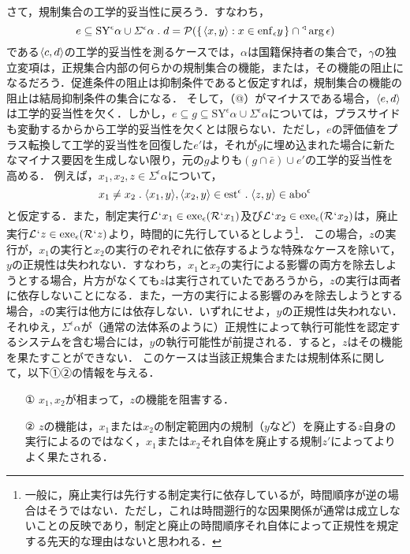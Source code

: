 さて，規制集合の工学的妥当性に戻ろう．すなわち，
\[
    e\subseteq \mathrm{SY}^{\epsilon}\alpha\cup \varSigma^{\epsilon}\alpha\con{1}d = \mathcal{P}(\classab{\orp{x,y}:x\in\enf{\epsilon}y}\cap\trgl{\arg\epsilon})
\]
である$ \langle c,d \rangle $の工学的妥当性を測るケースでは，$\alpha$は国籍保持者の集合で，$\gamma$の独立変項は，正規集合内部の何らかの規制集合の機能，または，その機能の阻止になるだろう．促進条件の阻止は抑制条件であると仮定すれば，規制集合の機能の阻止は結局抑制条件の集合になる．
そして，（@）がマイナスである場合，$ \langle e,d \rangle $は工学的妥当性を欠く．しかし，$ e\subseteq g \subseteq \mathrm{SY}^{\epsilon}\alpha\cup \varSigma^{\epsilon}\alpha $については，プラスサイドも変動するからから工学的妥当性を欠くとは限らない．ただし，$e$の評価値をプラス転換して工学的妥当性を回復した$ e' $は，それが$ g $に埋め込まれた場合に新たなマイナス要因を生成しない限り，元の$g$よりも$ (g\cap\bar{e})\cup e' $の工学的妥当性を高める．
例えば，$ x_1,x_2,z\in\varSigma^{\epsilon}\alpha $について，
\[
    x_1\neq x_2\con{1}\orp{x_1,y},\orp{x_2,y}\in\mathrm{est}^\epsilon\con{1}\orp{z,y}\in \mathrm{abo}^\epsilon
\]
と仮定する．また，制定実行$ \mathcal{L}{\mspace{1mu}{`}\mspace{1mu}} x_1\in\mathrm{exe}_{\epsilon}{(\mathcal{R}{\mspace{1mu}{`}\mspace{1mu}} x_1)} $及び$ \mathcal{L}{\mspace{1mu}{`}\mspace{1mu}} x_2\in\mathrm{exe}_{\epsilon}{(\mathcal{R}{\mspace{1mu}{`}\mspace{1mu}} x_2)} $は，廃止実行$ \mathcal{L}{\mspace{1mu}{`}\mspace{1mu}} z\in\mathrm{exe}_{\epsilon}{(\mathcal{R}{\mspace{1mu}{`}\mspace{1mu}} z)} $より，時間的に先行しているとしよう\footnote{
    一般に，廃止実行は先行する制定実行に依存しているが，時間順序が逆の場合はそうではない．ただし，これは時間遡行的な因果関係が通常は成立しないことの反映であり，制定と廃止の時間順序それ自体によって正規性を規定する先天的な理由はないと思われる．
}．
この場合，$z$の実行が，$x_1$の実行と$x_2$の実行のぞれぞれに依存するような特殊なケースを除いて，$y$の正規性は失われない．すなわち，$x_1$と$x_2$の実行による影響の両方を除去しようとする場合，片方がなくても$z$は実行されていたであろうから，$z$の実行は両者に依存しないことになる．また，一方の実行による影響のみを除去しようとする場合，$z$の実行は他方には依存しない．いずれにせよ，$y$の正規性は失われない．それゆえ，$ \varSigma^{\epsilon}\alpha $が（通常の法体系のように）正規性によって執行可能性を認定するシステムを含む場合には，$y$の執行可能性が前提される．すると，$z$はその機能を果たすことができない．
このケースは当該正規集合または規制体系に関して，以下①②の情報を与える．
\begin{enumerate}
    \item [①] $x_1,x_2$が相まって，$z$の機能を阻害する．
    \item [②] $z$の機能は，$x_1$または$x_2$の制定範囲内の規制（$y$など）を廃止する$z$自身の実行によるのではなく，$x_1$または$x_2$それ自体を廃止する規制$z'$によってよりよく果たされる．
\end{enumerate}
